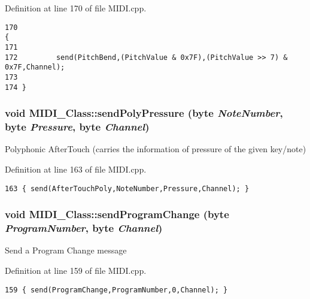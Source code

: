 Definition at line 170 of file MIDI.cpp.

\begin{Code}\begin{verbatim}170                                                                    {
171 
172         send(PitchBend,(PitchValue & 0x7F),(PitchValue >> 7) & 0x7F,Channel);
173         
174 }
\end{verbatim}
\end{Code}


\hypertarget{class_m_i_d_i___class_028ec5a49dccf9c28b00e11e7a3d1d05}{
\subsubsection[{sendPolyPressure}]{\setlength{\rightskip}{0pt plus 5cm}void MIDI\_\-Class::sendPolyPressure ({\bf byte} {\em NoteNumber}, \/  {\bf byte} {\em Pressure}, \/  {\bf byte} {\em Channel})}}
\label{class_m_i_d_i___class_028ec5a49dccf9c28b00e11e7a3d1d05}


Polyphonic AfterTouch (carries the information of pressure of the given key/note) 

Definition at line 163 of file MIDI.cpp.

\begin{Code}\begin{verbatim}163 { send(AfterTouchPoly,NoteNumber,Pressure,Channel); }
\end{verbatim}
\end{Code}


\hypertarget{class_m_i_d_i___class_803c2652837c09775d115354672bf69d}{
\subsubsection[{sendProgramChange}]{\setlength{\rightskip}{0pt plus 5cm}void MIDI\_\-Class::sendProgramChange ({\bf byte} {\em ProgramNumber}, \/  {\bf byte} {\em Channel})}}
\label{class_m_i_d_i___class_803c2652837c09775d115354672bf69d}


Send a Program Change message 

Definition at line 159 of file MIDI.cpp.

\begin{Code}\begin{verbatim}159 { send(ProgramChange,ProgramNumber,0,Channel); }
\end{verbatim}
\end{Code}


